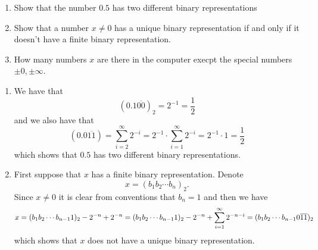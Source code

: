 \documentclass[11pt, a4paper]{article}
\begin{document}
\begin{exercise} \phantom{}
\begin{enumerate}
  \item[(1)] Show that the number $0.5$ has two different binary representations
  \item[(2)] Show that a number $x \neq 0$ has a unique binary representation
    if and only if it doesn't have a finite binary representation.
  \item[(3)] How many numbers $x$ are there in the computer execpt the
    special numbers $\pm 0, \pm \infty$.
\end{enumerate}
\end{exercise}
\begin{solution} \phantom{}
\begin{enumerate}
  \item[(1)] We have that
    \[
      (0.1 \overline{00})_{2} = 2^{-1} = \frac{1}{2}
    \]
    and we also have that
    \[
      (0.0\overline{11}) =
      \sum_{i=2}^{\infty} 2^{-i} =
      2^{-1} \cdot \sum_{i=1}^{\infty} 2^{-i} =
      2^{-1} \cdot 1 =
      \frac{1}{2}
    \]
    which shows that $0.5$ has two different binary representations.
  \item[(2)] First suppose that $x$ has a finite binary representation.
    Denote
    \[
      x = (b_1b_2\cdots b_n)_2.
    \]
    Since $x \neq 0$ it is clear from conventions that $b_n = 1$ and then
    we have
    \[
      x =
      (b_1b_2\cdots b_{n-1}1)_2 - 2^{-n} + 2^{-n} =
      (b_1b_2\cdots b_{n-1}1)_2 - 2^{-n} + \sum_{i=1}^{\infty} 2^{-n-i} \\ =
      (b_1b_2 \cdots b_{n-1} 0 \overline{11})_2
    \]
    which shows that $x$ does not have a unique binary representation.


\end{enumerate}
\end{solution}
\end{document}
